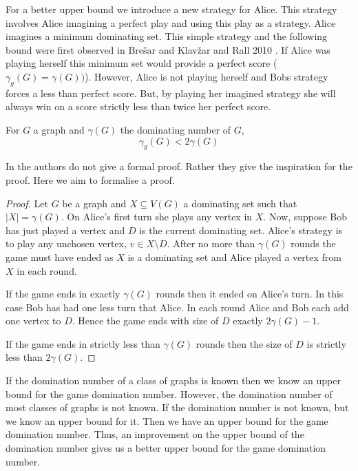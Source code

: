 For a better upper bound we introduce a new strategy for Alice. This strategy involves Alice imagining a perfect play and using this play as a strategy. Alice imagines a minimum dominating set. This simple strategy and the following bound were first observed in Bre\v{s}ar and Klav\v{z}ar and Rall 2010 \cite{BrKlRa2010}. If Alice was playing herself this minimum set would provide a perfect score ($\gamma_g(G)=\gamma(G))$). However, Alice is not playing herself and Bobs strategy forces a less than perfect score. But, by playing her imagined strategy she will always win on a score strictly less than twice her perfect score.

\begin{theorem}\label{thm:gamedomup}
    For $G$ a graph and $\gamma(G)$ the dominating number of $G$,  
    \[\gamma_g(G)<2\gamma(G)\]
\end{theorem}
In \cite{BrKlRa2010} the authors do not give a formal proof. Rather they give the inspiration for the proof. Here we aim to formalise a proof.
\begin{proof}
    Let $G$ be a graph and $X\subseteq V(G)$ a dominating set such that $|X| = \gamma(G)$. On Alice's first turn she plays any vertex in $X$. Now, suppose Bob has just played a vertex and $D$ is the current dominating set. Alice's strategy is to play any unchosen vertex, $v\in X\setminus D$. After no more than $\gamma(G)$ rounds the game must have ended as $X$ is a dominating set and Alice played a vertex from $X$ in each round. 
    
    If the game ends in exactly $\gamma(G)$ rounds then it ended on Alice's turn. In this case Bob has had one less turn that Alice. In each round Alice and Bob each add one vertex to $D$. Hence the game ends with size of $D$ exactly $2\gamma(G) -1$. 
    
    If the game ends in strictly less than $\gamma(G)$ rounds then the size of $D$ is strictly less than $2\gamma(G)$.
\end{proof}

If the domination number of a class of graphs is known then we know an upper bound for the game domination number. However, the domination number of most classes of graphs is not known. If the domination number is not known, but we know an upper bound for it. Then we have an upper bound for the game domination number. Thus, an improvement on the upper bound of the domination number gives us a better upper bound for the game domination number.

